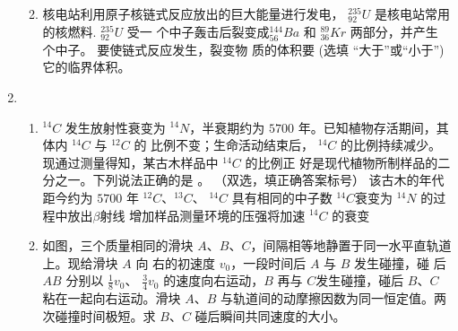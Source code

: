 \begin{enumerate}
\begin{enumerate}

\item 
核电站利用原子核链式反应放出的巨大能量进行发电， $ ^{235}_{92}U $ 是核电站常用的核燃料. $ ^{235}_{92}U $ 受一
个中子轰击后裂变成$ ^{144}_{56}Ba $ 和 $ ^{89}_{36} K r $ 两部分，并产生 \underlinegap 个中子。 要使链式反应发生，裂变物
质的体积要 \underlinegap  (选填 “大于”或“小于”)它的临界体积。


	
\end{enumerate}


\item 
{}
\begin{enumerate}
	\item
$ ^{14}C $ 发生放射性衰变为 $ ^{14} N $，半衰期约为 $ 5700 $ 年。已知植物存活期间，其体内 $ ^{14}C $ 与 $ ^{12}C $ 的
比例不变；生命活动结束后， $ ^{14}C $ 的比例持续减少。现通过测量得知，某古木样品中 $ ^{14}C $ 的比例正
好是现代植物所制样品的二分之一。下列说法正确的是 \underlinegap 。
（双选，填正确答案标号）
\fourchoices
{该古木的年代距今约为 $ 5700 $ 年}
{$ ^{12}C $、$ ^{13}C $、 $ ^{14}C $ 具有相同的中子数}
{$ ^{14}C $衰变为 $ ^{14}N $ 的过程中放出$ \beta $射线}
{增加样品测量环境的压强将加速 $ ^{14}C $ 的衰变}



\item 
如图，三个质量相同的滑块 $ A $、$ B $、$ C $，间隔相等地静置于同一水平直轨道上。现给滑块 $ A $ 向
右的初速度 $ v_{0} $，一段时间后 $ A $ 与 $ B $ 发生碰撞，碰
后 $ AB $ 分别以 $  \frac{ 1 }{ 8 } v_{0} $、
$  \frac{ 3 }{ 4 } v_{0} $ 的速度向右运动，$ B $ 再与
$ C $发生碰撞，碰后 $ B $、$ C $ 粘在一起向右运动。滑块 $ A $、$ B $ 与轨道间的动摩擦因数为同一恒定值。两
次碰撞时间极短。求 $ B $、$ C $ 碰后瞬间共同速度的大小。
\begin{figure}[h!]
	\flushright
	
\end{figure}



	
\end{enumerate}



\end{enumerate}
